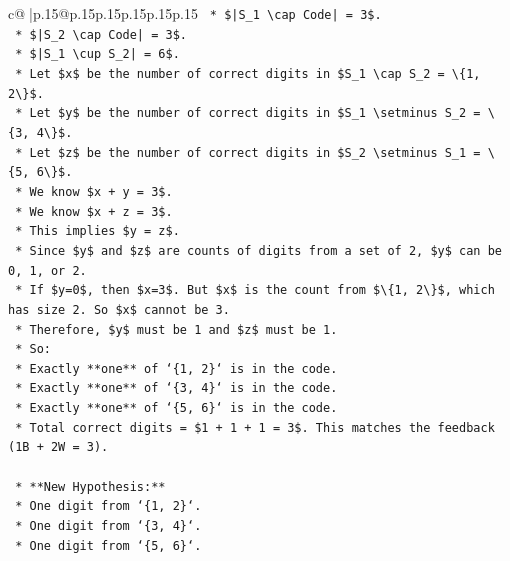 \documentclass{article}
\begin{document}
{\begin{supertabular}{c@{$\;$}|p{.15\linewidth}@{}p{.15\linewidth}p{.15\linewidth}p{.15\linewidth}p{.15\linewidth}p{.15\linewidth}}
{{{\texttt{            *   \$|S\_1 \textbackslash{}cap Code| = 3\$.} \\
\texttt{            *   \$|S\_2 \textbackslash{}cap Code| = 3\$.} \\
\texttt{            *   \$|S\_1 \textbackslash{}cup S\_2| = 6\$.} \\
\texttt{            *   Let \$x\$ be the number of correct digits in \$S\_1 \textbackslash{}cap S\_2 = \textbackslash{}\{1, 2\textbackslash{}\}\$.} \\
\texttt{            *   Let \$y\$ be the number of correct digits in \$S\_1 \textbackslash{}setminus S\_2 = \textbackslash{}\{3, 4\textbackslash{}\}\$.} \\
\texttt{            *   Let \$z\$ be the number of correct digits in \$S\_2 \textbackslash{}setminus S\_1 = \textbackslash{}\{5, 6\textbackslash{}\}\$.} \\
\texttt{            *   We know \$x + y = 3\$.} \\
\texttt{            *   We know \$x + z = 3\$.} \\
\texttt{            *   This implies \$y = z\$.} \\
\texttt{            *   Since \$y\$ and \$z\$ are counts of digits from a set of 2, \$y\$ can be 0, 1, or 2.} \\
\texttt{            *   If \$y=0\$, then \$x=3\$. But \$x\$ is the count from \$\textbackslash{}\{1, 2\textbackslash{}\}\$, which has size 2. So \$x\$ cannot be 3.} \\
\texttt{            *   Therefore, \$y\$ must be 1 and \$z\$ must be 1.} \\
\texttt{            *   So:} \\
\texttt{                *   Exactly **one** of `\{1, 2\}` is in the code.} \\
\texttt{                *   Exactly **one** of `\{3, 4\}` is in the code.} \\
\texttt{                *   Exactly **one** of `\{5, 6\}` is in the code.} \\
\texttt{            *   Total correct digits = \$1 + 1 + 1 = 3\$. This matches the feedback (1B + 2W = 3).} \\
\\ 
\texttt{    *   **New Hypothesis:**} \\
\texttt{        *   One digit from `\{1, 2\}`.} \\
\texttt{        *   One digit from `\{3, 4\}`.} \\
\texttt{        *   One digit from `\{5, 6\}`.} \\
}}}
\end{supertabular}}
\end{document}
